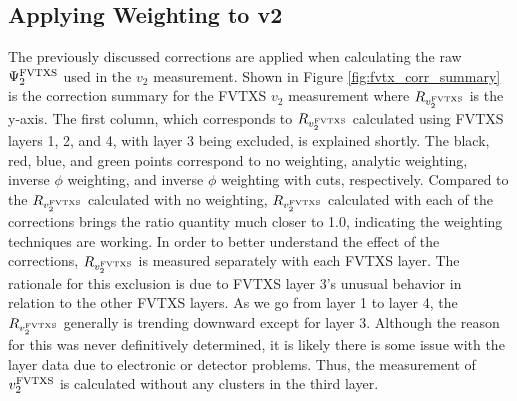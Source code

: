 \subsection{Applying Weighting to v2}
The previously discussed corrections are applied when calculating the raw $\Psi_2^{\rm FVTXS}$ used in the $v_2$ measurement. Shown in Figure \ref{fig:fvtx_corr_summary} is the correction summary for the FVTXS $v_2$ measurement where $R_{v_2^{\rm FVTXS}}$ is the y-axis. The first column, which corresponds to $R_{v_2^{\rm FVTXS}}$ calculated using FVTXS layers 1, 2, and 4, with layer 3 being excluded, is explained shortly. The black, red, blue, and green points correspond to no weighting, analytic weighting, inverse $\phi$ weighting, and inverse $\phi$ weighting with cuts, respectively. Compared to the $R_{v_2^{\rm FVTXS}}$ calculated with no weighting, $R_{v_2^{\rm FVTXS}}$ calculated with each of the corrections brings the ratio quantity much closer to 1.0, indicating the weighting techniques are working.  In order to better understand the effect of the corrections, $R_{v_2^{\rm FVTXS}}$ is measured separately with each FVTXS layer. The rationale for this exclusion is due to FVTXS layer 3's unusual behavior in relation to the other FVTXS layers. As we go from layer 1 to layer 4, the $R_{v_2^{\rm FVTXS}}$ generally is trending downward except for layer 3. Although the reason for this was never definitively determined, it is likely there is some issue with the layer data due to electronic or detector problems. Thus, the measurement of $v_2^{\rm FVTXS}$ is calculated without any clusters in the third layer.

